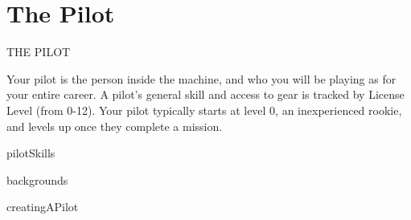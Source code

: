 \part{The Pilot}
  THE PILOT

Your pilot is the person inside the machine, and who you will be playing as for your entire career.
A pilot’s general skill and access to gear is tracked by License Level (from 0-12). Your pilot
typically starts at level 0, an inexperienced rookie, and levels up once they complete a
mission.


{pilotSkills}

{backgrounds}

{creatingAPilot}
